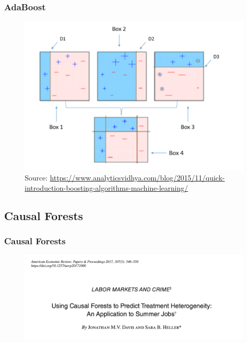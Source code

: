 \documentclass[
  shownotes,
  xcolor={svgnames},
  hyperref={colorlinks,citecolor=DarkBlue,linkcolor=DarkRed,urlcolor=DarkBlue}
  , aspectratio=169]{beamer}
\begin{document}
\begin{frame}[fragile]
\frametitle{AdaBoost}


\begin{figure}[H] \centering
            \captionsetup{justification=centering}
              \includegraphics[scale=0.5]{figures/adaboost.png}
              \\
              \tiny
              Source: \url{https://www.analyticsvidhya.com/blog/2015/11/quick-introduction-boosting-algorithms-machine-learning/}
 \end{figure}


\end{frame}

\subsection{Causal Forests}
\begin{frame}[fragile]
\frametitle{Causal Forests}

\begin{figure}[H] \centering
            \captionsetup{justification=centering}
              \includegraphics[scale=0.5]{figures/tress_summer_jobs}
              \\
            
 \end{figure}

\end{frame}
\end{document}
